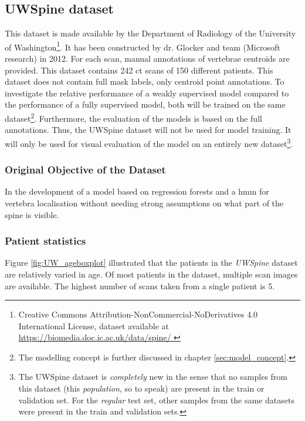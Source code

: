 \subsection{UWSpine dataset}
 
This dataset is made available by the Department of Radiology of the University of Washington\footnote{Creative Commons Attribution-NonCommercial-NoDerivatives 4.0 International License, dataset available at \url{
      https://biomedia.doc.ic.ac.uk/data/spine/  
    }}.
It has been constructed by dr. Glocker and team \cite{Glocker2012,Glocker2013} (Microsoft research) in 2012.
For each scan, manual annotations of vertebrae centroids are provided.
This dataset contains 242 \acrshort{ct} scans of 150 different patients.
This dataset does not contain full mask labels, only centroid point annotations.
To investigate the relative performance of a weakly supervised model compared to the performance of a fully supervised model, both will be trained on the same dataset\footnote{The modelling concept is further discussed in chapter \ref{sec:model_concept}.}.
Furthermore, the evaluation of the models is based on the full annotations.
Thus, the UWSpine dataset will not be used for model training.
It will only be used for visual evaluation of the model on an entirely new dataset\footnote{The UWSpine dataset is \textit{completely} new in the sense that no samples from this dataset (this \textit{population}, so to speak) are present in the train or validation set.
For the \textit{regular} test set, other samples from the same datasets were present in the train and validation sets.}.


\subsubsection{Original Objective of the Dataset}

In \cite{Glocker2012,Glocker2013} the development of a model based on regression forests and a \acrfull{hmm} for vertebra localisation without needing strong assumptions on what part of the spine is visible.

\subsubsection{Patient statistics}


Figure \ref{fig:UW_ageboxplot} illustrated that the patients in the \textit{UWSpine} dataset are relatively varied in age.
Of most patients in the dataset, multiple scan images are available.
The highest number of scans taken from a single patient is 5.

